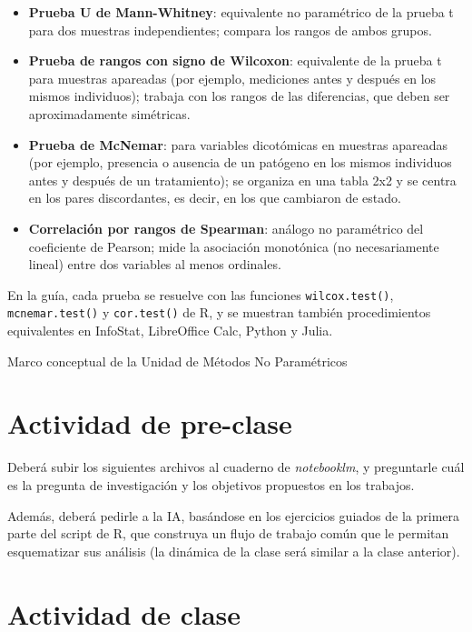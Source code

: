\documentclass[
  spanish,
  letterpaper,
  DIV=11,
  numbers=noendperiod]{scrreprt}
\providecommand{\tightlist}{%
  \setlength{\itemsep}{0pt}\setlength{\parskip}{0pt}}
\begin{document}
\begin{itemize}
\tightlist
\item
  \textbf{Prueba U de Mann-Whitney}: equivalente no paramétrico de la
  prueba t para dos muestras independientes; compara los rangos de ambos
  grupos.
\item
  \textbf{Prueba de rangos con signo de Wilcoxon}: equivalente de la
  prueba t para muestras apareadas (por ejemplo, mediciones antes y
  después en los mismos individuos); trabaja con los rangos de las
  diferencias, que deben ser aproximadamente simétricas.
\item
  \textbf{Prueba de McNemar}: para variables dicotómicas en muestras
  apareadas (por ejemplo, presencia o ausencia de un patógeno en los
  mismos individuos antes y después de un tratamiento); se organiza en
  una tabla 2x2 y se centra en los pares discordantes, es decir, en los
  que cambiaron de estado.
\item
  \textbf{Correlación por rangos de Spearman}: análogo no paramétrico
  del coeficiente de Pearson; mide la asociación monotónica (no
  necesariamente lineal) entre dos variables al menos ordinales.
\end{itemize}

En la guía, cada prueba se resuelve con las funciones
\texttt{wilcox.test()}, \texttt{mcnemar.test()} y \texttt{cor.test()} de
R, y se muestran también procedimientos equivalentes en InfoStat,
LibreOffice Calc, Python y Julia.

Marco conceptual de la Unidad de Métodos No Paramétricos

\section{\texorpdfstring{\textbf{Actividad de
pre-clase}}{Actividad de pre-clase}}\label{actividad-de-pre-clase-6}

Deberá subir los siguientes archivos al cuaderno de \emph{notebooklm}, y
preguntarle cuál es la pregunta de investigación y los objetivos
propuestos en los trabajos.

Además, deberá pedirle a la IA, basándose en los ejercicios guiados de
la primera parte del script de R, que construya un flujo de trabajo
común que le permitan esquematizar sus análisis (la dinámica de la clase
será similar a la clase anterior).

\section{\texorpdfstring{\textbf{Actividad de
clase}}{Actividad de clase}}\label{actividad-de-clase-4}
\end{document}
